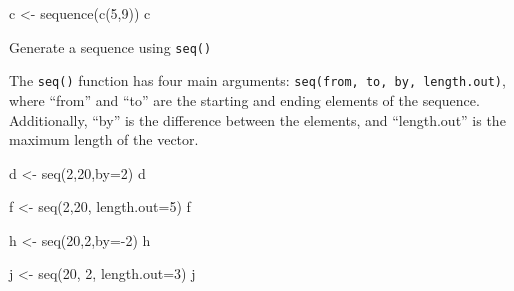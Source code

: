 \documentclass[
  letterpaper,
  DIV=11,
  numbers=noendperiod]{scrreprt}
\newenvironment{Shaded}{}{}
\newcommand{\AttributeTok}[1]{\textcolor[rgb]{0.84,0.23,0.29}{#1}}
\newcommand{\DecValTok}[1]{\textcolor[rgb]{0.00,0.36,0.77}{#1}}
\newcommand{\FunctionTok}[1]{\textcolor[rgb]{0.44,0.26,0.76}{#1}}
\newcommand{\NormalTok}[1]{\textcolor[rgb]{0.14,0.16,0.18}{#1}}
\newcommand{\OtherTok}[1]{\textcolor[rgb]{0.44,0.26,0.76}{#1}}
\newcommand{\SpecialCharTok}[1]{\textcolor[rgb]{0.00,0.36,0.77}{#1}}
\begin{document}
\begin{Shaded}
\begin{Highlighting}[]
\NormalTok{c }\OtherTok{\textless{}{-}} \FunctionTok{sequence}\NormalTok{(}\FunctionTok{c}\NormalTok{(}\DecValTok{5}\NormalTok{,}\DecValTok{9}\NormalTok{))}
\NormalTok{c}
\end{Highlighting}
\end{Shaded}

Generate a sequence using \texttt{seq()}

The \texttt{seq()} function has four main arguments:
\texttt{seq(from,\ to,\ by,\ length.out)}, where ``from'' and ``to'' are
the starting and ending elements of the sequence. Additionally, ``by''
is the difference between the elements, and ``length.out'' is the
maximum length of the vector.

\begin{Shaded}
\begin{Highlighting}[]
\NormalTok{d }\OtherTok{\textless{}{-}} \FunctionTok{seq}\NormalTok{(}\DecValTok{2}\NormalTok{,}\DecValTok{20}\NormalTok{,}\AttributeTok{by=}\DecValTok{2}\NormalTok{)}
\NormalTok{d}
\end{Highlighting}
\end{Shaded}

\begin{Shaded}
\begin{Highlighting}[]
\NormalTok{f }\OtherTok{\textless{}{-}} \FunctionTok{seq}\NormalTok{(}\DecValTok{2}\NormalTok{,}\DecValTok{20}\NormalTok{, }\AttributeTok{length.out=}\DecValTok{5}\NormalTok{)}
\NormalTok{f}
\end{Highlighting}
\end{Shaded}

\begin{Shaded}
\begin{Highlighting}[]
\NormalTok{h }\OtherTok{\textless{}{-}} \FunctionTok{seq}\NormalTok{(}\DecValTok{20}\NormalTok{,}\DecValTok{2}\NormalTok{,}\AttributeTok{by=}\SpecialCharTok{{-}}\DecValTok{2}\NormalTok{)}
\NormalTok{h}
\end{Highlighting}
\end{Shaded}

\begin{Shaded}
\begin{Highlighting}[]
\NormalTok{j }\OtherTok{\textless{}{-}} \FunctionTok{seq}\NormalTok{(}\DecValTok{20}\NormalTok{, }\DecValTok{2}\NormalTok{, }\AttributeTok{length.out=}\DecValTok{3}\NormalTok{)}
\NormalTok{j}
\end{Highlighting}
\end{Shaded}
\end{document}
